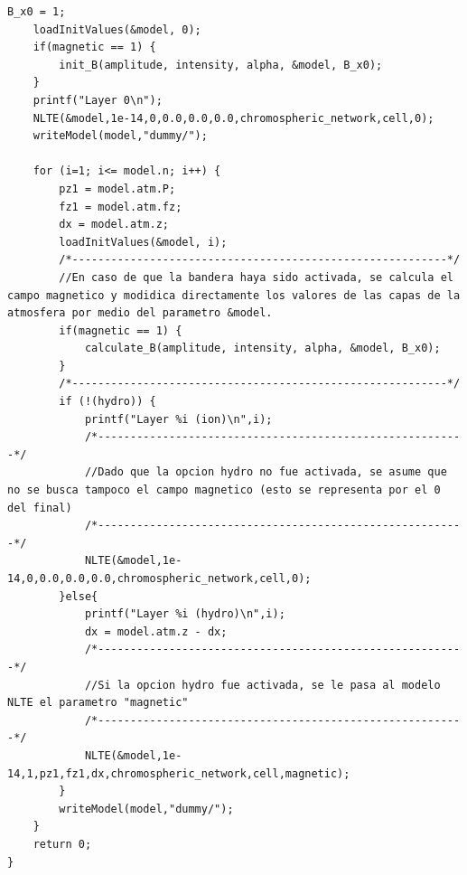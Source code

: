 \documentclass[9pt]{book}
\begin{document}
\begin{lstlisting}[style=CStyle]
	B_x0 = 1;
	loadInitValues(&model, 0);
	if(magnetic == 1) {
		init_B(amplitude, intensity, alpha, &model, B_x0);
	}
	printf("Layer 0\n");
	NLTE(&model,1e-14,0,0.0,0.0,0.0,chromospheric_network,cell,0);
	writeModel(model,"dummy/");

	for (i=1; i<= model.n; i++) {
		pz1 = model.atm.P;
		fz1 = model.atm.fz;
		dx = model.atm.z;
		loadInitValues(&model, i);
		/*----------------------------------------------------------*/	
		//En caso de que la bandera haya sido activada, se calcula el campo magnetico y modidica directamente los valores de las capas de la atmosfera por medio del parametro &model.
		if(magnetic == 1) {
			calculate_B(amplitude, intensity, alpha, &model, B_x0);
		}
		/*----------------------------------------------------------*/	
		if (!(hydro)) {
			printf("Layer %i (ion)\n",i);
			/*---------------------------------------------------------*/	
			//Dado que la opcion hydro no fue activada, se asume que no se busca tampoco el campo magnetico (esto se representa por el 0 del final)
			/*---------------------------------------------------------*/	
			NLTE(&model,1e-14,0,0.0,0.0,0.0,chromospheric_network,cell,0);
		}else{
			printf("Layer %i (hydro)\n",i);
			dx = model.atm.z - dx;
			/*---------------------------------------------------------*/	
			//Si la opcion hydro fue activada, se le pasa al modelo NLTE el parametro "magnetic"
			/*---------------------------------------------------------*/	
			NLTE(&model,1e-14,1,pz1,fz1,dx,chromospheric_network,cell,magnetic);
		}
		writeModel(model,"dummy/");
	}
	return 0;
}
\end{lstlisting}
\end{document}
